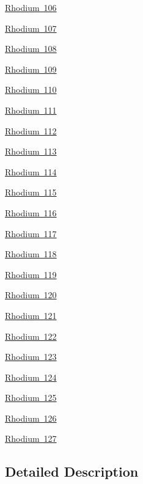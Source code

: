 \begin{DoxyCompactItemize}
\item 
\mbox{\hyperlink{group___isotope_const-_rhodium-_rh106}{Rhodium 106}}
\item 
\mbox{\hyperlink{group___isotope_const-_rhodium-_rh107}{Rhodium 107}}
\item 
\mbox{\hyperlink{group___isotope_const-_rhodium-_rh108}{Rhodium 108}}
\item 
\mbox{\hyperlink{group___isotope_const-_rhodium-_rh109}{Rhodium 109}}
\item 
\mbox{\hyperlink{group___isotope_const-_rhodium-_rh110}{Rhodium 110}}
\item 
\mbox{\hyperlink{group___isotope_const-_rhodium-_rh111}{Rhodium 111}}
\item 
\mbox{\hyperlink{group___isotope_const-_rhodium-_rh112}{Rhodium 112}}
\item 
\mbox{\hyperlink{group___isotope_const-_rhodium-_rh113}{Rhodium 113}}
\item 
\mbox{\hyperlink{group___isotope_const-_rhodium-_rh114}{Rhodium 114}}
\item 
\mbox{\hyperlink{group___isotope_const-_rhodium-_rh115}{Rhodium 115}}
\item 
\mbox{\hyperlink{group___isotope_const-_rhodium-_rh116}{Rhodium 116}}
\item 
\mbox{\hyperlink{group___isotope_const-_rhodium-_rh117}{Rhodium 117}}
\item 
\mbox{\hyperlink{group___isotope_const-_rhodium-_rh118}{Rhodium 118}}
\item 
\mbox{\hyperlink{group___isotope_const-_rhodium-_rh119}{Rhodium 119}}
\item 
\mbox{\hyperlink{group___isotope_const-_rhodium-_rh120}{Rhodium 120}}
\item 
\mbox{\hyperlink{group___isotope_const-_rhodium-_rh121}{Rhodium 121}}
\item 
\mbox{\hyperlink{group___isotope_const-_rhodium-_rh122}{Rhodium 122}}
\item 
\mbox{\hyperlink{group___isotope_const-_rhodium-_rh123}{Rhodium 123}}
\item 
\mbox{\hyperlink{group___isotope_const-_rhodium-_rh124}{Rhodium 124}}
\item 
\mbox{\hyperlink{group___isotope_const-_rhodium-_rh125}{Rhodium 125}}
\item 
\mbox{\hyperlink{group___isotope_const-_rhodium-_rh126}{Rhodium 126}}
\item 
\mbox{\hyperlink{group___isotope_const-_rhodium-_rh127}{Rhodium 127}}
\end{DoxyCompactItemize}


\subsection{Detailed Description}
